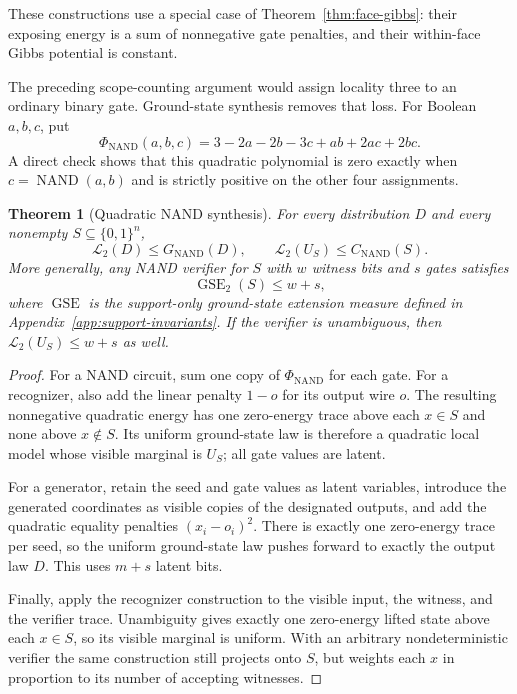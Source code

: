 \documentclass{article}
\newcommand{\LC}{\mathcal{L}}
\newcommand{\GSE}{\operatorname{GSE}}
\newcommand{\bits}{\{0,1\}}
\newtheorem{theorem}{Theorem}
\begin{document}
These constructions use a special case of
Theorem~\ref{thm:face-gibbs}: their exposing energy is a sum of nonnegative gate
penalties, and their within-face Gibbs potential is constant.

The preceding scope-counting argument would assign locality three to an
ordinary binary gate.  Ground-state synthesis removes that loss.  For Boolean
$a,b,c$, put
\[
  \Phi_{\mathrm{NAND}}(a,b,c)
  =3-2a-2b-3c+ab+2ac+2bc.
\]
A direct check shows that this quadratic polynomial is zero exactly when
$c=\operatorname{NAND}(a,b)$ and is strictly positive on the other four
assignments.

\begin{theorem}[Quadratic NAND synthesis]
\label{thm:nand-synthesis}
For every distribution $D$ and every nonempty $S\subseteq\bits^n$,
\[
  \LC_2(D)\le G_{\mathrm{NAND}}(D),
  \qquad
  \LC_2(U_S)\le C_{\mathrm{NAND}}(S).
\]
More generally, any NAND verifier for $S$ with $w$ witness bits and $s$ gates
satisfies
\[
  \GSE_2(S)\le w+s,
\]
where $\GSE$ is the support-only ground-state extension measure defined in
Appendix~\ref{app:support-invariants}.  If the verifier is unambiguous, then
$\LC_2(U_S)\le w+s$ as well.
\end{theorem}

\begin{proof}
For a NAND circuit, sum one copy of $\Phi_{\mathrm{NAND}}$ for each gate.
For a recognizer, also add the linear penalty $1-o$ for its output wire $o$.
The resulting nonnegative quadratic energy has one zero-energy trace above
each $x\in S$ and none above $x\notin S$.  Its uniform ground-state law is
therefore a quadratic local model whose visible marginal is $U_S$; all gate
values are latent.

For a generator, retain the seed and gate values as latent variables, introduce
the generated coordinates as visible copies of the designated outputs, and
add the quadratic equality penalties $(x_i-o_i)^2$.  There is exactly one
zero-energy trace per seed, so the uniform ground-state law pushes forward to
exactly the output law $D$.  This uses $m+s$ latent bits.

Finally, apply the recognizer construction to the visible input, the witness,
and the verifier trace.  Unambiguity gives exactly one zero-energy lifted state
above each $x\in S$, so its visible marginal is uniform.  With an arbitrary
nondeterministic verifier the same construction still projects onto $S$, but
weights each $x$ in proportion to its number of accepting witnesses.
\end{proof}
\end{document}
